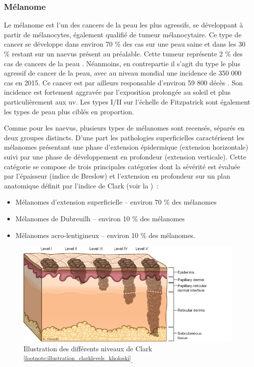 \subsubsection{Mélanome}
Le mélanome est l'un des cancers de la peau les plus agressifs, se développant à partir de mélanocytes, également qualifié de tumeur mélanocytaire. Ce type de cancer se développe dans environ 70 \% des cas sur une peau saine et dans les 30 \% restant sur un naevus présent au préalable. Cette tumeur représente 2 \% des cas de cancers de la peau \cite{TortoraG;Derrickson2012}. Néanmoins, en contrepartie il s’agit du type le plus agressif de cancer de la peau, avec au niveau mondial une incidence de 350 000 cas en 2015. Ce cancer est par ailleurs responsable d’environ 59 800 décès \cite{Karimkhani2017}. Son incidence est fortement aggravée par l’exposition prolongée au soleil et plus particulièrement aux \gls{uv}. Les types I/II sur l’échelle de Fitzpatrick sont également les types de peau plus ciblés en proportion.\par

Comme pour les naevus, plusieurs types de mélanomes sont recensés, séparés en deux groupes distincts. D’une part les pathologies superficielles caractérisent les mélanomes présentant une phase d’extension épidermique (extension horizontale) suivi par une phase de développement en profondeur (extension verticale). Cette catégorie se compose de trois principales catégories dont la sévérité est évaluée par l'épaisseur (indice de Breslow) et l'extension en profondeur sur un plan anatomique définit par l'indice de Clark (voir la )~:
\begin{itemize}
\item Mélanomes d'extension superficielle – environ 70 \% des mélanomes
\item Mélanomes de Dubreuilh – environ 10 \% des mélanomes \cite{LeGal2011}
\item Mélanomes acro-lentigineux – environ 10 \% des mélanomes.
\end{itemize}

\begin{figure}[H]
    \centering
    \includegraphics[width=0.7\linewidth]{contents/chapter_1/resources/illustration_clarklevels_kholoski.png}
    \caption{Illustration des différents niveaux de Clark \cite{Clark1969} \textsuperscript{\ref{footnote:illustration_clarklevels_kholoski}}.}
    \label{fig:illustration_clarklevels_kholoski}
\end{figure}\par

